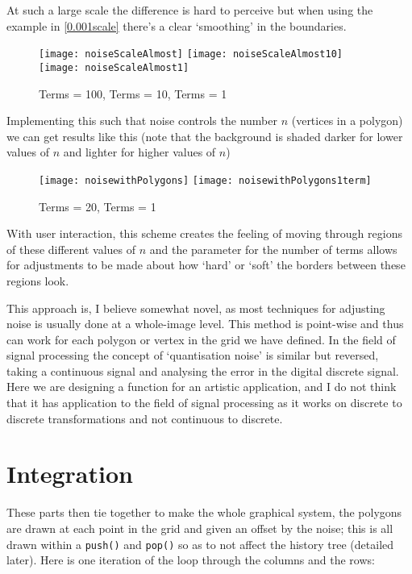 At such a large scale the difference is hard to perceive but when using the
example in \autoref{0.001scale} there's a clear `smoothing' in the boundaries.

\begin{figure}[H]
\centering
\texttt{[image: noiseScaleAlmost]}
\hspace{0.2cm}
\texttt{[image: noiseScaleAlmost10]}
\hspace{0.2cm}
\texttt{[image: noiseScaleAlmost1]}
\caption{Terms = 100, Terms = 10, Terms = 1}
\end{figure}

Implementing this such that noise controls the number $n$ (vertices in a
polygon) we can get results like this (note that the background is shaded darker
for lower values of $n$ and lighter for higher values of $n$)
\begin{figure}[H]
\centering
\texttt{[image: noisewithPolygons]}
\hspace{0.2cm}
\texttt{[image: noisewithPolygons1term]}
\caption{Terms = 20, Terms = 1}
\end{figure}

With user interaction, this scheme creates the feeling of moving through regions
of these different values of $n$ and the parameter for the number of terms
allows for adjustments to be made about how `hard' or `soft' the borders between
these regions look.

This approach is, I believe somewhat novel, as most techniques for adjusting
noise is usually done at a whole-image level. This method is point-wise and thus
can work for each polygon or vertex in the grid we have defined. In the field of
signal processing the concept of `quantisation noise' is similar but reversed,
taking a continuous signal and analysing the error in the digital discrete
signal. Here we are designing a function for an artistic application, and I do
not think that it has application to the field of signal processing as it works
on discrete to discrete transformations and not continuous to discrete.

\section{Integration}
These parts then tie together to make the whole graphical system, the polygons
are drawn at each point in the grid and given an offset by the noise; this is
all drawn within a \verb|push()| and \verb|pop()| so as to not affect the
history tree (detailed later). Here is one iteration of the loop through the
columns and the rows:

